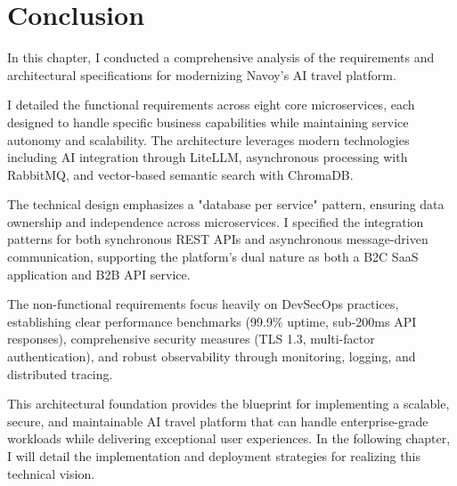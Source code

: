 \setcounter{secnumdepth}{0} %
\section{Conclusion}
In this chapter, I conducted a comprehensive analysis of the requirements and architectural specifications for modernizing Navoy's AI travel platform.

I detailed the functional requirements across eight core microservices, each designed to handle specific business capabilities while maintaining service autonomy and scalability. The architecture leverages modern technologies including AI integration through LiteLLM, asynchronous processing with RabbitMQ, and vector-based semantic search with ChromaDB.

The technical design emphasizes a "database per service" pattern, ensuring data ownership and independence across microservices. I specified the integration patterns for both synchronous REST APIs and asynchronous message-driven communication, supporting the platform's dual nature as both a B2C SaaS application and B2B API service.

The non-functional requirements focus heavily on DevSecOps practices, establishing clear performance benchmarks (99.9\% uptime, sub-200ms API responses), comprehensive security measures (TLS 1.3, multi-factor authentication), and robust observability through monitoring, logging, and distributed tracing.

This architectural foundation provides the blueprint for implementing a scalable, secure, and maintainable AI travel platform that can handle enterprise-grade workloads while delivering exceptional user experiences. In the following chapter, I will detail the implementation and deployment strategies for realizing this technical vision.
